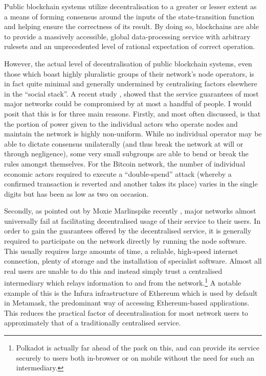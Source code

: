 \documentclass[9pt,oneside]{amsart}
\begin{document}
Public blockchain systems utilize decentralisation to a greater or lesser extent as a means of forming consensus around the inputs of the state-transition function and helping ensure the correctness of its result. By doing so, blockchains are able to provide a massively accessible, global data-processing service with arbitrary rulesets and an unprecedented level of rational expectation of correct operation.

However, the actual level of decentralisation of public blockchain systems, even those which boast highly pluralistic groups of their network's node operators, is in fact quite minimal and generally undermined by centralising factors elsewhere in the ``social stack''. A recent study \cite{sultanik2022blockchains}, showed that the service guarantees of most major networks could be compromised by at most a handful of people. I would posit that this is for three main reasons. Firstly, and most often discussed, is that the portion of power given to the individual actors who operate nodes and maintain the network is highly non-uniform. While no individual operator may be able to dictate consensus unilaterally (and thus break the network at will or through negligence), some very small subgroups are able to bend or break the rules amongst themselves. For the Bitcoin network, the number of individual economic actors required to execute a ``double-spend'' attack (whereby a confirmed transaction is reverted and another takes its place) varies in the single digits but has been as low as two on occasion.

Secondly, as pointed out by Moxie Marlinspike recently \cite{marlinspike2022my}, major networks almost universally fail at facilitating decentralised usage of their service to their users. In order to gain the guarantees offered by the decentralised service, it is generally required to participate on the network directly by running the node software. This usually requires large amounts of time, a reliable, high-speed internet connection, plenty of storage and the installation of specialist software. Almost all real users are unable to do this and instead simply trust a centralised intermediary which relays information to and from the network.\footnote{Polkadot is actually far ahead of the pack on this, and can provide its service securely to users both in-browser or on mobile without the need for such an intermediary.} A notable example of this is the Infura infrastructure of Ethereum which is used by default in Metamask, the predominant way of accessing Ethereum-based applications. This reduces the practical factor of decentralisation for most network users to approximately that of a traditionally centralised service.
\end{document}
